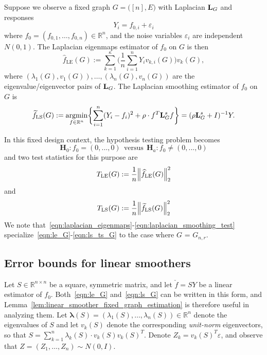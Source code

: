 \documentclass{article}
\newcommand{\Reals}{\mathbb{R}}
\newcommand{\1}{\mathbf{1}}
\DeclareMathOperator*{\argmin}{argmin}
\newcommand{\lambdavec}{\boldsymbol{\lambda}}
\newcommand{\Lap}{{\bf L}}
\newcommand{\Id}{I}
\newcommand{\wt}[1]{\widetilde{#1}}
\newcommand{\wh}[1]{\widehat{#1}}
\newcommand{\LE}{\mathrm{LE}}
\newcommand{\LS}{\mathrm{LS}}
\theoremstyle{alden}
\theoremstyle{aldenthm}
\theoremstyle{definition}
\theoremstyle{remark}
\begin{document}
Suppose we observe a fixed graph $G = \bigl([n],E\bigr)$ with Laplacian $\Lap_G$ and responses
\begin{equation}
\label{eqn:fixed_graph_regression_model}
Y_i = f_{0,i} + \varepsilon_i
\end{equation}
where $f_0 = (f_{0,1},\ldots,f_{0,n}) \in \Reals^n$, and the noise variables $\varepsilon_i$ are independent $N(0,1)$. The Laplacian eigenmaps estimator of $f_0$ on $G$ is then
\begin{equation}
\label{eqn:le_G}
\wh{f}_{\LE}(G) := \sum_{k = 1}^{\kappa} \biggl(\frac{1}{n}\sum_{i = 1}^{n} Y_i v_{k,i}(G) \biggr) v_k(G),
\end{equation}
where $(\lambda_1(G),v_1(G)),\ldots,(\lambda_n(G),v_n(G))$ are the eigenvalue/eigenvector pairs of $\Lap_G$. The Laplacian smoothing estimator of $f_0$ on $G$ is
\begin{equation}
\label{eqn:ls_G}
\wt{f}_{\LS}(G) := \argmin_{f \in \Reals^n} \biggl\{ \sum_{i = 1}^{n}(Y_i - f_i)^2 + \rho \cdot f^T \Lap_G^{s}  f \biggr\} = (\rho \Lap_G^s + \Id)^{-1}Y.
\end{equation}

In this fixed design context, the hypothesis testing problem becomes
\begin{equation*}
\mathbf{H}_0: f_{0} = (0,...,0) ~~\textrm{versus}~~ \mathbf{H}_a: f_{0} \neq (0,...,0)
\end{equation*}
and two test statistics for this purpose are
\begin{equation}
\label{eqn:le_ts_G}
T_{\LE}(G) := \frac{1}{n} \Bigl\|\wh{f}_{\LE}(G)\Bigr\|_2^2 
\end{equation}
and
\begin{equation}
\label{eqn:ls_ts_G}
T_{\LS}(G) := \frac{1}{n} \Bigl\|\wt{f}_{\LS}(G)\Bigr\|_2^2 
\end{equation}
We note that~\eqref{eqn:laplacian_eigenmaps}-\eqref{eqn:laplacian_smoothing_test} specialize~\eqref{eqn:le_G}-\eqref{eqn:ls_ts_G} to the case where $G$ = $G_{n,r}$.

\subsection{Error bounds for linear smoothers}
Let $S \in \Reals^{n \times n}$ be a square, symmetric matrix, and let $\check{f} = SY$ be a linear estimator of $f_0$. Both~\eqref{eqn:le_G} and~\eqref{eqn:ls_G} can be written in this form, and Lemma~\ref{lem:linear_smoother_fixed_graph_estimation} is therefore useful in analyzing them. Let $\lambdavec(S) = (\lambda_1(S),\ldots,\lambda_n(S)) \in \Reals^n$ denote the eigenvalues of $S$ and let $v_k(S)$ denote the corresponding \emph{unit-norm} eigenvectors, so that $S = \sum_{k = 1}^{n} \lambda_k(S) \cdot v_k(S) v_k(S)^T$. Denote $Z_k = v_k(S)^T \varepsilon$, and observe that $Z = (Z_1,\ldots,Z_n) \sim N(0,\Id)$. 
\end{document}
